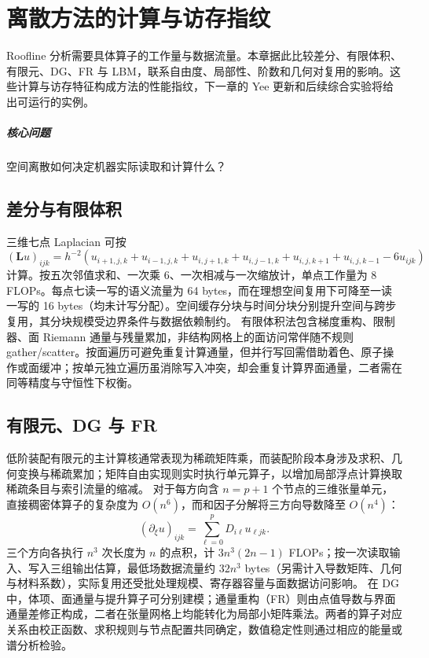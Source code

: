\chapter{离散方法的计算与访存指纹}\label{v0ch:23}
\begin{chaptersummary}
Roofline 分析需要具体算子的工作量与数据流量。本章据此比较差分、有限体积、有限元、DG、FR 与 LBM，联系自由度、局部性、阶数和几何对复用的影响。这些计算与访存特征构成方法的性能指纹，下一章的 Yee 更新和后续综合实验将给出可运行的实例。
\end{chaptersummary}
\paragraph{核心问题}空间离散如何决定机器实际读取和计算什么？

\section{差分与有限体积}
三维七点 Laplacian 可按
\[
 (\bm L u)_{ijk}
 =h^{-2}(u_{i+1,j,k}+u_{i-1,j,k}+u_{i,j+1,k}
 +u_{i,j-1,k}+u_{i,j,k+1}+u_{i,j,k-1}-6u_{ijk})
\]
计算。按五次邻值求和、一次乘 6、一次相减与一次缩放计，单点工作量为 8 FLOPs。每点七读一写的语义流量为 64 bytes，而在理想空间复用下可降至一读一写的 16 bytes（均未计写分配）。空间缓存分块与时间分块分别提升空间与跨步复用，其分块规模受边界条件与数据依赖制约。
有限体积法包含梯度重构、限制器、面 Riemann 通量与残量累加，非结构网格上的面访问常伴随不规则 gather/scatter。按面遍历可避免重复计算通量，但并行写回需借助着色、原子操作或面缓冲；按单元独立遍历虽消除写入冲突，却会重复计算界面通量，二者需在同等精度与守恒性下权衡。
\section{有限元、DG 与 FR}
低阶装配有限元的主计算核通常表现为稀疏矩阵乘，而装配阶段本身涉及求积、几何变换与稀疏累加；矩阵自由实现则实时执行单元算子，以增加局部浮点计算换取稀疏条目与索引流量的缩减。
对于每方向含 $n=p+1$ 个节点的三维张量单元，直接稠密体算子的复杂度为 $O(n^6)$，而和因子分解将三方向导数降至 $O(n^4)$：
\[
 (\partial_\xi u)_{ijk}=\sum_{\ell=0}^{p}D_{i\ell}u_{\ell jk}.
\]
三个方向各执行 $n^3$ 次长度为 $n$ 的点积，计 $3n^3(2n-1)$ FLOPs；按一次读取输入、写入三组输出估算，最低场数据流量约 $32n^3$ bytes（另需计入导数矩阵、几何与材料系数），实际复用还受批处理规模、寄存器容量与面数据访问影响。
在 DG 中，体项、面通量与提升算子可分别建模；通量重构（FR）则由点值导数与界面通量差修正构成，二者在张量网格上均能转化为局部小矩阵乘法。两者的算子对应关系由校正函数、求积规则与节点配置共同确定，数值稳定性则通过相应的能量或谱分析检验。
